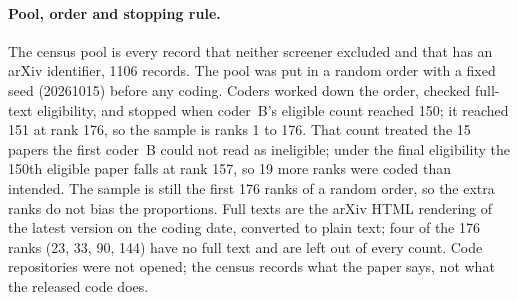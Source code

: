 \documentclass[acmsmall,screen]{acmart}
\begin{document}
\paragraph{Pool, order and stopping rule.}
The census pool is every record that neither screener excluded and that has an arXiv identifier, 1106 records. The pool was put in a random order with a fixed seed (20261015) before any coding. Coders worked down the order, checked full-text eligibility, and stopped when coder~B's eligible count reached 150; it reached 151 at rank 176, so the sample is ranks 1 to 176. That count treated the 15 papers the first coder~B could not read as ineligible; under the final eligibility the 150th eligible paper falls at rank 157, so 19 more ranks were coded than intended. The sample is still the first 176 ranks of a random order, so the extra ranks do not bias the proportions. %
Full texts are the arXiv HTML rendering of the latest version on the coding date, converted to plain text; four of the 176 ranks (23, 33, 90, 144) have no full text and are left out of every count. %
Code repositories were not opened; the census records what the paper says, not what the released code does. %
\end{document}
